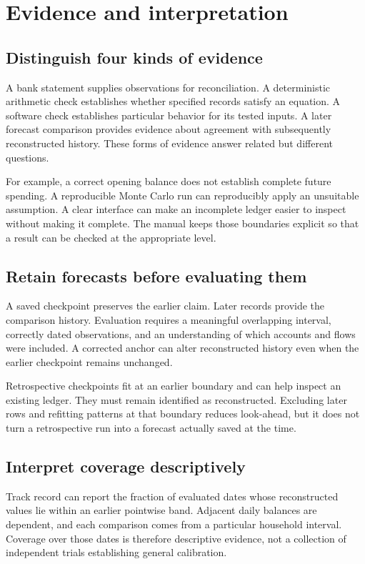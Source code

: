 \chapter{Evidence and interpretation}\label{ch:evidence}
\section{Distinguish four kinds of evidence}
A bank statement supplies observations for reconciliation. A deterministic arithmetic check establishes whether specified records satisfy an equation. A software check establishes particular behavior for its tested inputs. A later forecast comparison provides evidence about agreement with subsequently reconstructed history. These forms of evidence answer related but different questions.

For example, a correct opening balance does not establish complete future spending. A reproducible Monte Carlo run can reproducibly apply an unsuitable assumption. A clear interface can make an incomplete ledger easier to inspect without making it complete. The manual keeps those boundaries explicit so that a result can be checked at the appropriate level.

\section{Retain forecasts before evaluating them}
A saved checkpoint preserves the earlier claim. Later records provide the comparison history. Evaluation requires a meaningful overlapping interval, correctly dated observations, and an understanding of which accounts and flows were included. A corrected anchor can alter reconstructed history even when the earlier checkpoint remains unchanged.

Retrospective checkpoints fit at an earlier boundary and can help inspect an existing ledger. They must remain identified as reconstructed. Excluding later rows and refitting patterns at that boundary reduces look-ahead, but it does not turn a retrospective run into a forecast actually saved at the time.

\section{Interpret coverage descriptively}
Track record can report the fraction of evaluated dates whose reconstructed values lie within an earlier pointwise band. Adjacent daily balances are dependent, and each comparison comes from a particular household interval. Coverage over those dates is therefore descriptive evidence, not a collection of independent trials establishing general calibration.


